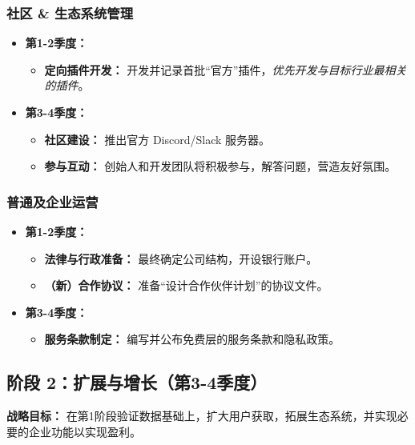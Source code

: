 \documentclass[11点, A4纸, 单面]{article}
\begin{document}
\subsubsection{社区 \& 生态系统管理}
\begin{itemize}[leftmargin=*]
    \item \textbf{第1-2季度：}
    \begin{itemize}
        \item \textbf{定向插件开发：} 开发并记录首批“官方”插件，\textit{优先开发与目标行业最相关的插件}。
    \end{itemize}
    \item \textbf{第3-4季度：}
    \begin{itemize}
        \item \textbf{社区建设：} 推出官方 Discord/Slack 服务器。
        \item \textbf{参与互动：} 创始人和开发团队将积极参与，解答问题，营造友好氛围。
    \end{itemize}
\end{itemize}

\subsubsection{普通及企业运营}
\begin{itemize}[leftmargin=*]
    \item \textbf{第1-2季度：}
    \begin{itemize}
        \item \textbf{法律与行政准备：} 最终确定公司结构，开设银行账户。
        \item \textbf{（新）合作协议：} 准备“设计合作伙伴计划”的协议文件。
    \end{itemize}
    \item \textbf{第3-4季度：}
    \begin{itemize}
        \item \textbf{服务条款制定：} 编写并公布免费层的服务条款和隐私政策。
    \end{itemize}
\end{itemize}

\clearpage

\subsection{阶段 2：扩展与增长（第3-4季度）}
\textbf{战略目标：} 在第1阶段验证数据基础上，扩大用户获取，拓展生态系统，并实现必要的企业功能以实现盈利。
\end{document}
